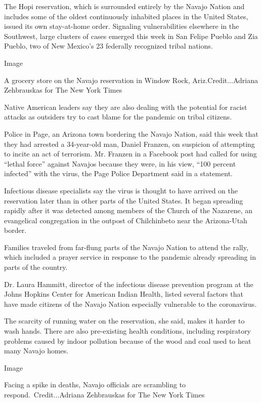 The Hopi reservation, which is surrounded entirely by the Navajo Nation
and includes some of the oldest continuously inhabited places in the
United States, issued its own stay-at-home order. Signaling
vulnerabilities elsewhere in the Southwest, large clusters of cases
emerged this week in San Felipe Pueblo and Zia Pueblo, two of New
Mexico's 23 federally recognized tribal nations.

Image

A grocery store on the Navajo reservation in Window Rock,
Ariz.Credit...Adriana Zehbrauskas for The New York Times

Native American leaders say they are also dealing with the potential for
racist attacks as outsiders try to cast blame for the pandemic on tribal
citizens.

Police in Page, an Arizona town bordering the Navajo Nation, said this
week that they had arrested a 34-year-old man, Daniel Franzen, on
suspicion of attempting to incite an act of terrorism. Mr. Franzen in a
Facebook post had called for using ``lethal force'' against Navajos
because they were, in his view, ``100 percent infected'' with the virus,
the Page Police Department said in a statement.

Infectious disease specialists say the virus is thought to have arrived
on the reservation later than in other parts of the United States. It
began spreading rapidly after it was detected among members of the
Church of the Nazarene, an evangelical congregation in the outpost of
Chilchinbeto near the Arizona-Utah border.

Families traveled from far-flung parts of the Navajo Nation to attend
the rally, which included a prayer service in response to the pandemic
already spreading in parts of the country.

Dr. Laura Hammitt, director of the infectious disease prevention program
at the Johns Hopkins Center for American Indian Health, listed several
factors that have made citizens of the Navajo Nation especially
vulnerable to the coronavirus.

The scarcity of running water on the reservation, she said, makes it
harder to wash hands. There are also pre-existing health conditions,
including respiratory problems caused by indoor pollution because of the
wood and coal used to heat many Navajo homes.

Image

Facing a spike in deaths, Navajo officials are scrambling to
respond.~Credit...Adriana Zehbrauskas for The New York Times

